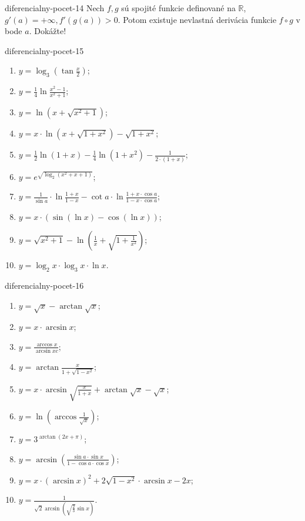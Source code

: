 \begin{defproblem}{diferencialny-pocet-14}
Nech $f,g$ sú spojité funkcie definované na $\mathbb{R}$, $g'(a)=+\infty,f'(g(a))>0$. Potom existuje nevlastná derivácia funkcie $f \circ g$ v bode $a$. Dokážte!
\end{defproblem}

\begin{defproblem}{diferencialny-pocet-15}
\begin{multicols}{2}
\begin{enumerate}
    \item $y=\log_{3}(\tan \frac{x}{2})$;
    \item $y=\frac{1}{4}\ln \frac{x^2-1}{x^2+1}$;
    \item $y=\ln (x+\sqrt{x^2+1})$;
    \item $y=x\cdot\ln (x+\sqrt{1+x^2})-\sqrt{1+x^2}$;
    \item $y=\frac{1}{2} \ln (1+x)-\frac{1}{4} \ln (1+x^2)-\frac{1}{2\cdot(1+x)}$;
    \item $y=e^{\sqrt{\log_2(x^2+x+1)}}$;
    \item $y=\frac{1}{\sin a}\cdot\ln \frac{1+x}{1-x}-\cot a\cdot\ln \frac{1+x\cdot\cos a}{1-x\cdot\cos a}$;
    \item $y=x\cdot(\sin(\ln x)-\cos(\ln x))$;
    \item $y=\sqrt{x^2+1}-\ln (\frac{1}{x}+\sqrt{1+\frac{1}{x^2}})$;
    \item $y=\log_2 x\cdot\log_3 x\cdot\ln x$.
\end{enumerate}
\end{multicols}
\end{defproblem}

\begin{defproblem}{diferencialny-pocet-16}
\begin{multicols}{2}
\begin{enumerate}
    \item $y=\sqrt{x}-\arctan\sqrt{x}$;
    \item $y=x\cdot\arcsin x$;
    \item $y=\frac{\arccos x}{\arcsin xc}$;
    \item $y=\arctan \frac{x}{1+\sqrt{1-x^2}}$;
    \item $y=x\cdot\arcsin \sqrt{\frac{x}{1+x}}+\arctan \sqrt{x}-\sqrt{x}$;
    \item $y=\ln (\arccos \frac{1}{\sqrt{x}})$;
    \item $y=3^{\arctan(2x+\pi)}$;
    \item $y=\arcsin(\frac{\sin a\cdot \sin x}{1-\cos a\cdot\cos x})$;
    \item $y=x\cdot(\arcsin x)^2+2\sqrt{1-x^2}\cdot\arcsin x-2x$;
    \item $y=\frac{1}{\sqrt{2}\arcsin(\sqrt{\frac{2}{3}}\sin x)}$.
\end{enumerate}
\end{multicols}
\end{defproblem}

